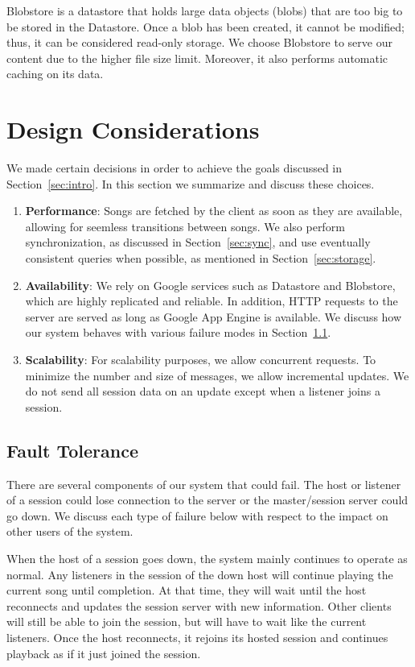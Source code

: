 Blobstore is a datastore that holds large data objects (blobs) that 
are too big to be stored in the Datastore. Once a blob has been 
created, it cannot be modified; thus, it can be considered read-only
storage. We choose Blobstore to serve our content due to the higher
file size limit. Moreover, it also performs automatic caching on its 
data. \cite{appengine}

\section{Design Considerations}
\label{sec:considerations}
We made certain decisions in order to achieve the goals discussed
in Section~\ref{sec:intro}. In this section we summarize and discuss these choices.
\begin{enumerate}
  \item \textbf{Performance}: Songs are fetched by the client as soon as they are available, 
  		allowing for seemless transitions between songs.
  		We also perform synchronization, as discussed in Section~\ref{sec:sync}, 
  		and use eventually consistent queries when possible, as mentioned in 
  		Section~\ref{sec:storage}.
  \item \textbf{Availability}: We rely on Google services such as 
  		Datastore and Blobstore, which are highly replicated and reliable. 
  		In addition, HTTP requests to the server are served as long as 
  		Google App Engine is available. We discuss how our system
		behaves with various failure modes in Section~\ref{sec:faultTolerance}.
  \item \textbf{Scalability}: For scalability purposes, we allow concurrent requests.
  		To minimize the number and size of messages, we allow incremental
  		updates. We do not send all session data on an update except when
  		a listener joins a session.
\end{enumerate}

\subsection{Fault Tolerance}
\label{sec:faultTolerance}
There are several components of our system that could fail. The host or listener
of a session could lose connection to the server or the master/session server
could go down. We discuss each type of
failure below with respect to the impact on other users of the system.

When the host of a session goes down, the system mainly continues
to operate as normal. Any listeners in the session of the down host
will continue playing the current song until completion. At that
time, they will wait until the host reconnects and updates the
session server with new information. Other clients will still be
able to join the session, but will have to wait like the current
listeners. Once the host reconnects, it rejoins its hosted session
and continues playback as if it just joined the session.


